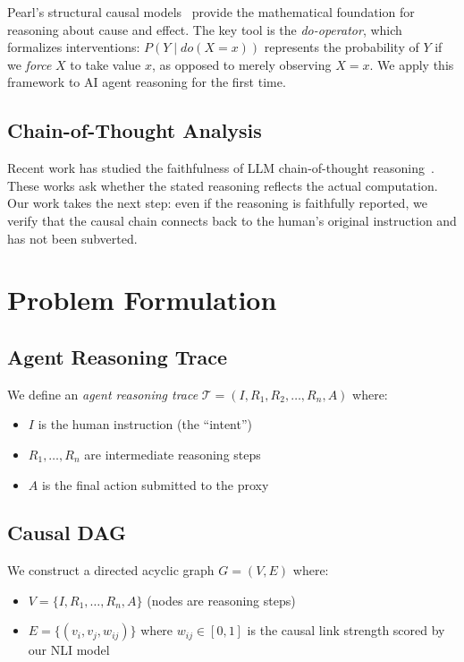 \documentclass{article}
\begin{document}
Pearl's structural causal models~\cite{pearl2009} provide the mathematical foundation for reasoning about cause and effect. The key tool is the \textit{do-operator}, which formalizes interventions: $P(Y \mid do(X=x))$ represents the probability of $Y$ if we \textit{force} $X$ to take value $x$, as opposed to merely observing $X=x$. We apply this framework to AI agent reasoning for the first time.

\subsection{Chain-of-Thought Analysis}

Recent work has studied the faithfulness of LLM chain-of-thought reasoning~\cite{turpin2023, lanham2023}. These works ask whether the stated reasoning reflects the actual computation. Our work takes the next step: even if the reasoning is faithfully reported, we verify that the causal chain connects back to the human's original instruction and has not been subverted.

\section{Problem Formulation}

\subsection{Agent Reasoning Trace}

We define an \textit{agent reasoning trace} $\mathcal{T} = (I, R_1, R_2, \ldots, R_n, A)$ where:
\begin{itemize}
    \item $I$ is the human instruction (the ``intent'')
    \item $R_1, \ldots, R_n$ are intermediate reasoning steps
    \item $A$ is the final action submitted to the proxy
\end{itemize}

\subsection{Causal DAG}

We construct a directed acyclic graph $G = (V, E)$ where:
\begin{itemize}
    \item $V = \{I, R_1, \ldots, R_n, A\}$ (nodes are reasoning steps)
    \item $E = \{(v_i, v_j, w_{ij})\}$ where $w_{ij} \in [0, 1]$ is the causal link strength scored by our NLI model
\end{itemize}
\end{document}
